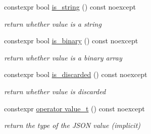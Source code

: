 \begin{DoxyCompactItemize}
constexpr bool \hyperlink{classnlohmann_1_1basic__json_ab303d17366c26fca12242c7f8def1bb7}{is\+\_\+string} () const noexcept
\begin{DoxyCompactList}\small\item\em return whether value is a string \end{DoxyCompactList}\item 
constexpr bool \hyperlink{classnlohmann_1_1basic__json_a9576224f7b3ff812a308e7c1e784ea80}{is\+\_\+binary} () const noexcept
\begin{DoxyCompactList}\small\item\em return whether value is a binary array \end{DoxyCompactList}\item 
constexpr bool \hyperlink{classnlohmann_1_1basic__json_aecaaa0613d3f3a5b49b34b02afc5f85d}{is\+\_\+discarded} () const noexcept
\begin{DoxyCompactList}\small\item\em return whether value is discarded \end{DoxyCompactList}\item 
constexpr \hyperlink{classnlohmann_1_1basic__json_a6d4b8df10ecc533a50823e8805f4a873}{operator value\+\_\+t} () const noexcept
\begin{DoxyCompactList}\small\item\em return the type of the J\+S\+ON value (implicit) \end{DoxyCompactList}\end{DoxyCompactItemize}
